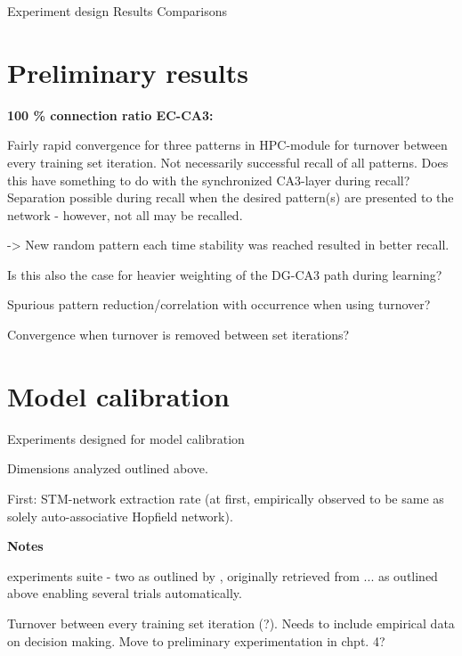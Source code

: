 Experiment design
Results
Comparisons

\section{Preliminary results}

\textbf{100 \% connection ratio EC-CA3:}

Fairly rapid convergence for three patterns in HPC-module for turnover between every training set iteration. 
Not necessarily successful recall of all patterns. Does this have something to do with the synchronized CA3-layer during recall? Separation possible during recall when the desired pattern(s) are presented to the network - however, not all may be recalled.

-> New random pattern each time stability was reached resulted in better recall.

Is this also the case for heavier weighting of the DG-CA3 path during learning?

Spurious pattern reduction/correlation with occurrence when using turnover?

Convergence when turnover is removed between set iterations?

\section{Model calibration}

Experiments designed for model calibration

Dimensions analyzed outlined above.

First: STM-network extraction rate (at first, empirically observed to be same as solely auto-associative Hopfield network).


\textbf{Notes}

experiments suite - two as outlined by \citep{Hattori2014}, originally retrieved from ... as outlined above
enabling several trials automatically.

Turnover between every training set iteration (?). Needs to include empirical data on decision making. Move to preliminary experimentation in chpt. 4?

\cleardoublepage